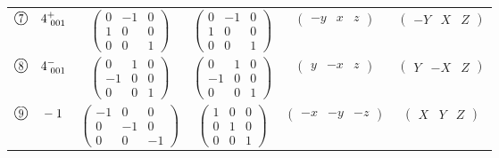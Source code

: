 \documentclass[fleqn,10pt,landscape]{jsarticle}
\begin{document}
\begin{center}
\begin{longtable}{lcccc}
$ {\ooalign{\hfil\resizebox{.8\width}{\height}{7}\hfil\crcr\raise.1ex\hbox{\large$\bigcirc$}}}\quad 4^{+}_{\,\,001} $ & $ \begin{pmatrix} 0 & -1 & 0 \\ 1 & 0 & 0 \\ 0 & 0 & 1 \end{pmatrix} $ & $ \begin{pmatrix} 0 & -1 & 0 \\ 1 & 0 & 0 \\ 0 & 0 & 1 \end{pmatrix} $ & $ \begin{pmatrix} - y & x & z \end{pmatrix} $ & $ \begin{pmatrix} - Y & X & Z \end{pmatrix} $ \\
$ {\ooalign{\hfil\resizebox{.8\width}{\height}{8}\hfil\crcr\raise.1ex\hbox{\large$\bigcirc$}}}\quad 4^{-}_{\,\,001} $ & $ \begin{pmatrix} 0 & 1 & 0 \\ -1 & 0 & 0 \\ 0 & 0 & 1 \end{pmatrix} $ & $ \begin{pmatrix} 0 & 1 & 0 \\ -1 & 0 & 0 \\ 0 & 0 & 1 \end{pmatrix} $ & $ \begin{pmatrix} y & - x & z \end{pmatrix} $ & $ \begin{pmatrix} Y & - X & Z \end{pmatrix} $ \\
$ {\ooalign{\hfil\resizebox{.8\width}{\height}{9}\hfil\crcr\raise.1ex\hbox{\large$\bigcirc$}}}\quad -1 $ & $ \begin{pmatrix} -1 & 0 & 0 \\ 0 & -1 & 0 \\ 0 & 0 & -1 \end{pmatrix} $ & $ \begin{pmatrix} 1 & 0 & 0 \\ 0 & 1 & 0 \\ 0 & 0 & 1 \end{pmatrix} $ & $ \begin{pmatrix} - x & - y & - z \end{pmatrix} $ & $ \begin{pmatrix} X & Y & Z \end{pmatrix} $ \\

\end{longtable}
\end{center}
\end{document}
